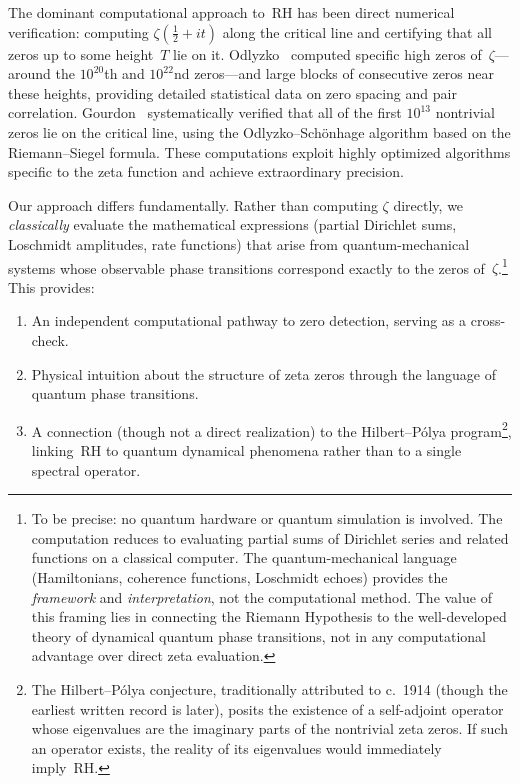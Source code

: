 The dominant computational approach to~RH has been direct numerical verification:
computing $\zeta(\tfrac{1}{2} + it)$ along the critical line and certifying that all
zeros up to some height~$T$ lie on it. Odlyzko~\cite{odlyzko1989,odlyzko2001} computed
specific high zeros of~$\zeta$---around the $10^{20}$th and $10^{22}$nd zeros---and
large blocks of consecutive zeros near these heights, providing detailed statistical
data on zero spacing and pair correlation. Gourdon~\cite{gourdon2004} systematically
verified that all of the first $10^{13}$ nontrivial zeros lie on the critical line,
using the Odlyzko--Sch\"onhage algorithm based on the Riemann--Siegel formula. These
computations exploit highly optimized algorithms specific to the zeta function and
achieve extraordinary precision.

Our approach differs fundamentally. Rather than computing $\zeta$ directly, we
\emph{classically} evaluate the mathematical expressions (partial Dirichlet sums,
Loschmidt amplitudes, rate functions) that arise from quantum-mechanical systems
whose observable phase transitions correspond exactly to the zeros
of~$\zeta$.\footnote{To be precise: no quantum hardware or quantum simulation is
involved. The computation reduces to evaluating partial sums of Dirichlet series and
related functions on a classical computer. The quantum-mechanical language (Hamiltonians,
coherence functions, Loschmidt echoes) provides the \emph{framework} and
\emph{interpretation}, not the computational method. The value of this framing lies in
connecting the Riemann Hypothesis to the well-developed theory of dynamical quantum phase
transitions, not in any computational advantage over direct zeta evaluation.} This
provides:
\begin{enumerate}
  \item An independent computational pathway to zero detection, serving as a cross-check.
  \item Physical intuition about the structure of zeta zeros through the language of
        quantum phase transitions.
  \item A connection (though not a direct realization) to the Hilbert--P\'olya
        program\footnote{The Hilbert--P\'olya conjecture, traditionally attributed to
        c.~1914 (though the earliest written record is later), posits the existence of
        a self-adjoint operator whose eigenvalues are the imaginary parts of the
        nontrivial zeta zeros. If such an operator exists, the reality of its
        eigenvalues would immediately imply~RH.}, linking~RH to quantum dynamical
        phenomena rather than to a single spectral operator.
\end{enumerate}

